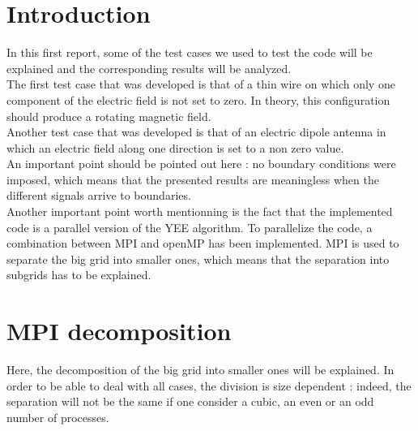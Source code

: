 \documentclass[12 pt]{article}
\begin{document}

\section{Introduction}
In this first report, some of the test cases we used to test the code will be explained and the corresponding results will be analyzed. \\
The first test case that was developed is that of a thin wire on which only one component of the electric field is not set to zero. In theory, this configuration should produce a rotating magnetic field. \\
Another test case that was developed is that of an electric dipole antenna in which an electric field along one direction is set to a non zero value. \\
An important point should be pointed out here : no boundary conditions were imposed, which means that the presented results are meaningless when the different signals arrive to boundaries. \\
Another important point worth mentionning is the fact that the implemented code is a parallel version of the YEE algorithm. To parallelize the code, a combination between MPI and openMP has been implemented. MPI is used to separate the big grid into smaller ones, which means that the separation into subgrids has to be explained.



\section{MPI decomposition}
Here, the decomposition of the big grid into smaller ones will be explained. In order to be able to deal with all cases, the division is size dependent : indeed, the separation will not be the same if one consider a cubic, an even or an odd number of processes.
\end{document}
